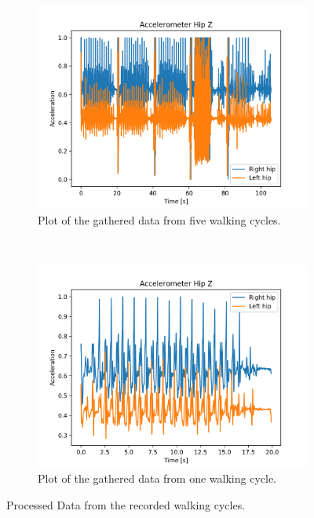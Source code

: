 \begin{figure}[H]
    \centering
    \begin{subfigure}[b]{0.5\textwidth}
        \centering
        \includegraphics[width=1\textwidth]{include/figure/RLH5.png}
        \caption{Plot of the gathered data from five walking cycles.}
        \label{fig:RLH5}
    \end{subfigure}%
    ~ 
    \begin{subfigure}[b]{0.5\textwidth}
        \centering
        \includegraphics[width=1\textwidth]{include/figure/RLH1.png}
        \caption{Plot of the gathered data from one walking cycle.}
        \label{fig:RLH1}
    \end{subfigure}
    \caption{Processed Data from the recorded walking cycles.}
    \label{fig:WalkingCycles}
\end{figure}

